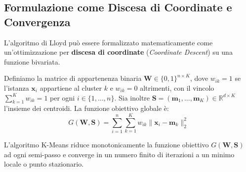 \subsection{Formulazione come Discesa di Coordinate e Convergenza}

L'algoritmo di Lloyd può essere formalizzato matematicamente come un'ottimizzazione per \textbf{discesa di coordinate} (\textit{Coordinate Descent}) su una funzione bivariata.

Definiamo la matrice di appartenenza binaria $\mathbf{W} \in \{0, 1\}^{n \times K}$, dove $w_{ik} = 1$ se l'istanza $\mathbf{x}_i$ appartiene al cluster $k$ e $w_{ik} = 0$ altrimenti, con il vincolo $\sum_{k=1}^K w_{ik} = 1$ per ogni $i \in \{1, \dots, n\}$. Sia inoltre $\mathbf{S} = (\mathbf{m}_1, \dots, \mathbf{m}_K) \in \mathbb{R}^{d \times K}$ l'insieme dei centroidi. La funzione obiettivo globale è:
\begin{equation}
    G(\mathbf{W}, \mathbf{S}) = \sum_{i=1}^n \sum_{k=1}^K w_{ik} \|\mathbf{x}_i - \mathbf{m}_k\|_2^2
    \label{eq:dm-kmeans-coordinate-descent-obj}
\end{equation}

\begin{theorem}
L'algoritmo K-Means riduce monotonicamente la funzione obiettivo $G(\mathbf{W}, \mathbf{S})$ ad ogni semi-passo e converge in un numero finito di iterazioni a un minimo locale o punto stazionario.
\end{theorem}

